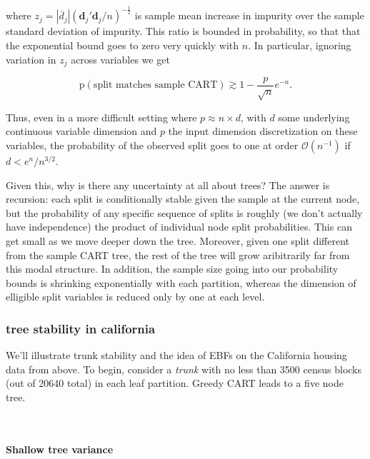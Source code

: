 \documentclass[12pt]{article}
\begin{document}
where
$z_j = \left|\bar{d}_j\right|\left(\mathbf{d}_j'\mathbf{d}_j/n\right)^{-\frac{1}{2}}$
is sample mean increase in impurity over the sample standard deviation
of impurity. This ratio is bounded in probability, so that that the
exponential bound goes to zero very quickly with $n$. In particular,
ignoring variation in $z_j$ across variables we get

\[
\mathrm{p}\left(\text{split matches sample CART}\right) \gtrsim 1 - \frac{p}{\sqrt{n}} e^{-n}.
\]

Thus, even in a more difficult setting where $p \approx n\times d$, with
$d$ some underlying continuous variable dimension and $p$ the input
dimension discretization on these variables, the probability of the
observed split goes to one at order $\mathcal{O}(n^{-1})$ if
$d < e^{n}/n^{3/2}$.

Given this, why is there any uncertainty at all about trees? The answer
is recursion: each split is conditionally stable given the sample at the
current node, but the probability of any specific sequence of splits is
roughly (we don't actually have independence) the product of individual
node split probabilities. This can get small as we move deeper down the
tree. Moreover, given one split different from the sample CART tree, the
rest of the tree will grow aribitrarily far from this modal structure.
In addition, the sample size going into our probability bounds is
shrinking exponentially with each partition, whereas the dimension of
elligible split variables is reduced only by one at each level.

\subsubsection{tree stability in california}\label{tree-stability-in-california}

We'll illustrate trunk stability and the idea of EBFs on the California
housing data from above. To begin, consider a \emph{trunk} with no less
than 3500 census blocks (out of 20640 total) in each leaf partition.
Greedy CART leads to a five node tree.

    
    \begin{center}
    \end{center}
    { \hspace*{\fill} \\}
    

    \paragraph{Shallow tree variance}\label{shallow-tree-variance}
\end{document}
